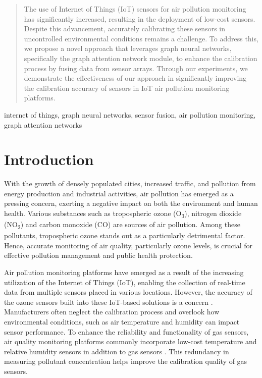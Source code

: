 \documentclass[conference,a4paper]{IEEEtran}
\begin{document}
\begin{abstract}
The use of Internet of Things (IoT) sensors for air pollution monitoring has significantly increased, resulting in the deployment of low-cost sensors. Despite this advancement, accurately calibrating these sensors in uncontrolled environmental conditions remains a challenge. To address this, we propose a novel approach that leverages  graph neural networks, specifically the graph attention network module, to enhance the calibration process by fusing data from sensor arrays. Through our experiments, we demonstrate the effectiveness of our approach in significantly improving the calibration accuracy of sensors in IoT air pollution monitoring platforms.
\end{abstract}

\begin{IEEEkeywords}
internet of things, graph neural networks, sensor fusion, air pollution monitoring, graph attention networks
\end{IEEEkeywords}

\section{Introduction}
With the growth of densely populated cities, increased traffic, and pollution from energy production and industrial activities, air pollution has emerged as a pressing concern, exerting a negative impact on both the environment and human health. Various substances such as tropospheric ozone (O\textsubscript 3), nitrogen dioxide (NO\textsubscript 2) and carbon monoxide (CO) are sources of air pollution\cite{spinelle2015field}. Among these pollutants, tropospheric ozone stands out as a particularly detrimental factor. Hence, accurate monitoring of air quality, particularly ozone levels, is crucial for effective pollution management and public health protection\cite{lu2019meteorology}.

Air pollution monitoring platforms have emerged as a result of the increasing utilization of the Internet of Things (IoT), enabling the collection of real-time data from multiple  sensors placed in various locations. However, the accuracy of the ozone sensors built into these IoT-based solutions is a concern \cite{lewis2018low}. Manufacturers often neglect the calibration process  and overlook how environmental conditions, such as air temperature and humidity can impact sensor performance. To enhance the reliability and functionality of gas sensors, air quality monitoring platforms commonly incorporate low-cost temperature and relative humidity sensors in addition  to gas sensors \cite{cross2017use}. This redundancy in measuring pollutant concentration helps improve the calibration quality of gas sensors.
\end{document}
